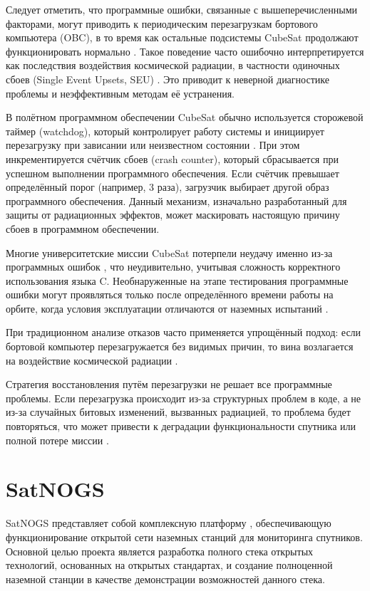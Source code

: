 Следует отметить, что программные ошибки, связанные с вышеперечисленными
факторами, могут приводить к периодическим перезагрузкам бортового компьютера
(OBC), в то время как остальные подсистемы CubeSat продолжают функционировать
нормально \cite{langer2009reliability}. Такое поведение часто ошибочно
интерпретируется как последствия воздействия космической радиации, в частности
одиночных сбоев (Single Event Upsets, SEU) \cite{koopman2020edge}. Это приводит
к неверной диагностике проблемы и неэффективным методам её устранения.

В полётном программном обеспечении CubeSat обычно используется сторожевой таймер
(watchdog), который контролирует работу системы и инициирует перезагрузку при
зависании или неизвестном состоянии \cite{kastensmidt2019fault}. При этом
инкрементируется счётчик сбоев (crash counter), который сбрасывается при
успешном выполнении программного обеспечения. Если счётчик превышает
определённый порог (например, 3 раза), загрузчик выбирает другой образ
программного обеспечения. Данный механизм, изначально разработанный для защиты
от радиационных эффектов, может маскировать настоящую причину сбоев в
программном обеспечении.

Многие университетские миссии CubeSat потерпели неудачу именно из-за программных
ошибок \cite{guo2014flight}, что неудивительно, учитывая сложность корректного
использования языка C. Необнаруженные на этапе тестирования программные ошибки
могут проявляться только после определённого времени работы на орбите, когда
условия эксплуатации отличаются от наземных испытаний
\cite{dubey2009evaluating}.

При традиционном анализе отказов часто применяется упрощённый подход: если
бортовой компьютер перезагружается без видимых причин, то вина возлагается на
воздействие космической радиации \cite{maurer2008harsh}.

Стратегия восстановления путём перезагрузки не решает все программные проблемы.
Если перезагрузка происходит из-за структурных проблем в коде, а не из-за
случайных битовых изменений, вызванных радиацией, то проблема будет повторяться,
что может привести к деградации функциональности спутника или полной потере
миссии \cite{lee2019dependable}.


\section{SatNOGS}

SatNOGS представляет собой комплексную платформу \cite{satnogs_general_docs},
обеспечивающую функционирование открытой сети наземных станций для мониторинга
спутников. Основной целью проекта является разработка полного стека открытых
технологий, основанных на открытых стандартах, и создание полноценной наземной
станции в качестве демонстрации возможностей данного стека.

